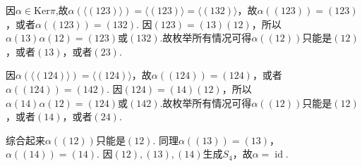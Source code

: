 \documentclass[../../main.tex]{subfiles}%
\begin{document}
\begin{solution}
因$\alpha\in \text{Ker}\pi$,故$\alpha(\langle(123)\rangle) = \langle(123)\rangle=\langle(132)\rangle$，故$\alpha((123)) = (123)$，或者$\alpha((123)) = (132)$. 因$(123) = (13)(12)$，所以$\alpha(13)\alpha(12)=(123)$或$(132)$.故枚举所有情况可得$\alpha((12))$只能是$(12)$，或者$(13)$，或者$(23)$.

因$\alpha(\langle(124)\rangle) = \langle(124)\rangle$，故$\alpha((124)) = (124)$，或者$\alpha((124)) = (142)$. 因$(124) = (14)(12)$，所以$\alpha(14)\alpha(12)=(124)$或$(142)$.故枚举所有情况可得$\alpha((12))$只能是$(12)$，或者$(14)$，或者$(24)$.

综合起来$\alpha((12))$只能是$(12)$.
同理$\alpha((13)) = (13)$，$\alpha((14)) = (14)$. 因$(12), (13), (14)$生成$S_4$，故$\alpha = \operatorname{id}$.

\end{solution}
\end{document}
